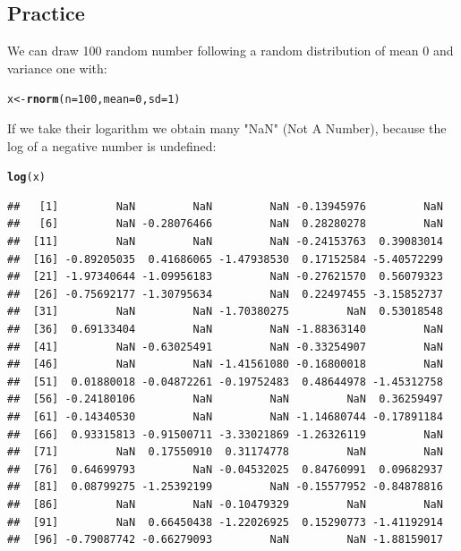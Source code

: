 \documentclass[12pt,a4paper]{scrartcl}\usepackage[]{graphicx}\usepackage[]{color}
\makeatletter
\newcommand{\hlnum}[1]{\textcolor[rgb]{0.686,0.059,0.569}{#1}}%
\newcommand{\hlstd}[1]{\textcolor[rgb]{0.345,0.345,0.345}{#1}}%
\newcommand{\hlkwb}[1]{\textcolor[rgb]{0.69,0.353,0.396}{#1}}%
\newcommand{\hlkwc}[1]{\textcolor[rgb]{0.333,0.667,0.333}{#1}}%
\newcommand{\hlkwd}[1]{\textcolor[rgb]{0.737,0.353,0.396}{\textbf{#1}}}%
\newenvironment{kframe}{%
 \def\at@end@of@kframe{}%
 \ifinner\ifhmode%
  \def\at@end@of@kframe{\end{minipage}}%
  \begin{minipage}{\columnwidth}%
 \fi\fi%
 \def\FrameCommand##1{\hskip\@totalleftmargin \hskip-\fboxsep
 \colorbox{shadecolor}{##1}\hskip-\fboxsep
     \hskip-\linewidth \hskip-\@totalleftmargin \hskip\columnwidth}%
 \MakeFramed {\advance\hsize-\width
   \@totalleftmargin\z@ \linewidth\hsize
   \@setminipage}}%
 {\par\unskip\endMakeFramed%
 \at@end@of@kframe}
\newenvironment{knitrout}{}{} %
\makeatother
\begin{document}
\subsection{Practice}

We can draw 100 random number following a random distribution of mean 0 and variance one with:
\begin{knitrout}
\color{fgcolor}\begin{kframe}
\begin{alltt}
\hlstd{x} \hlkwb{<-} \hlkwd{rnorm}\hlstd{(}\hlkwc{n} \hlstd{=} \hlnum{100}\hlstd{,} \hlkwc{mean} \hlstd{=} \hlnum{0}\hlstd{,} \hlkwc{sd} \hlstd{=} \hlnum{1}\hlstd{)}
\end{alltt}
\end{kframe}
\end{knitrout}

If we take their logarithm we obtain many "NaN" (Not A Number), because the log of a negative number is undefined:
\begin{knitrout}
\color{fgcolor}\begin{kframe}
\begin{alltt}
\hlkwd{log}\hlstd{(x)}
\end{alltt}


{\ttfamily\noindent\color{warningcolor}{\#\# Warning in log(x): NaNs produced}}\begin{verbatim}
##   [1]         NaN         NaN         NaN -0.13945976         NaN
##   [6]         NaN -0.28076466         NaN  0.28280278         NaN
##  [11]         NaN         NaN         NaN -0.24153763  0.39083014
##  [16] -0.89205035  0.41686065 -1.47938530  0.17152584 -5.40572299
##  [21] -1.97340644 -1.09956183         NaN -0.27621570  0.56079323
##  [26] -0.75692177 -1.30795634         NaN  0.22497455 -3.15852737
##  [31]         NaN         NaN -1.70380275         NaN  0.53018548
##  [36]  0.69133404         NaN         NaN -1.88363140         NaN
##  [41]         NaN -0.63025491         NaN -0.33254907         NaN
##  [46]         NaN         NaN -1.41561080 -0.16800018         NaN
##  [51]  0.01880018 -0.04872261 -0.19752483  0.48644978 -1.45312758
##  [56] -0.24180106         NaN         NaN         NaN  0.36259497
##  [61] -0.14340530         NaN         NaN -1.14680744 -0.17891184
##  [66]  0.93315813 -0.91500711 -3.33021869 -1.26326119         NaN
##  [71]         NaN  0.17550910  0.31174778         NaN         NaN
##  [76]  0.64699793         NaN -0.04532025  0.84760991  0.09682937
##  [81]  0.08799275 -1.25392199         NaN -0.15577952 -0.84878816
##  [86]         NaN         NaN -0.10479329         NaN         NaN
##  [91]         NaN  0.66450438 -1.22026925  0.15290773 -1.41192914
##  [96] -0.79087742 -0.66279093         NaN         NaN -1.88159017
\end{verbatim}
\end{kframe}
\end{knitrout}
\end{document}
